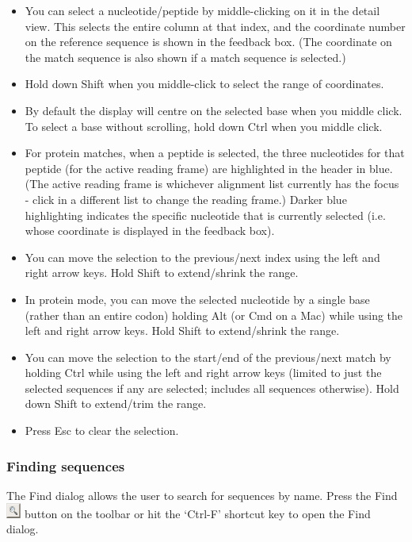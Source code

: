 \documentclass[letterpaper]{article}
\newcommand\liststyleWWviiiNumxiii{%
\renewcommand\labelitemi{{\textbullet}}
\renewcommand\labelitemii{o}
\renewcommand\labelitemiii{[F0A7?]}
\renewcommand\labelitemiv{[F0B7?]}
}
\begin{document}
\liststyleWWviiiNumxiii
\begin{itemize}
\item 
You can select a nucleotide/peptide by middle-clicking on it in the detail view. This selects the entire column at that index, and the coordinate number on the reference sequence is shown in the feedback box. (The coordinate on the match sequence is also shown if a match sequence is selected.)
\item
Hold down Shift when you middle-click to select the range of coordinates.
\item
By default the display will centre on the selected base when you middle click. To select a base without scrolling, hold down Ctrl when you middle click.
\item
For protein matches, when a peptide is selected, the three nucleotides for that peptide (for the active reading frame) are highlighted in the header in blue. (The active reading frame is whichever alignment list currently has the focus - click in a different list to change the reading frame.) Darker blue highlighting indicates the specific nucleotide that is currently selected (i.e. whose coordinate is displayed in the feedback box).
\item
You can move the selection to the previous/next index using the left and right arrow keys. Hold Shift to extend/shrink the range.
\item
In protein mode, you can move the selected nucleotide by a single base (rather than an entire codon) holding Alt (or Cmd on a Mac) while using the left and right arrow keys. Hold Shift to extend/shrink the range.
\item
You can move the selection to the start/end of the previous/next match by holding Ctrl while using the left and right arrow keys (limited to just the selected sequences if any are selected; includes all sequences otherwise). Hold down Shift to extend/trim the range.
\item Press Esc to clear the selection.
\end{itemize}

{\color[rgb]{0.30980393,0.5058824,0.7411765}\subsubsection[Finding sequences]{Finding sequences}}
\hypertarget{RefHeading1961056909880}{}{
The Find dialog allows the user to search for sequences by name. Press
the Find 
\includegraphics[width=0.487cm,height=0.487cm]{img_button_find.png} 
button on the toolbar or hit the
{\textquoteleft}Ctrl-F{\textquoteright} shortcut key to open the Find
dialog.}
\end{document}
